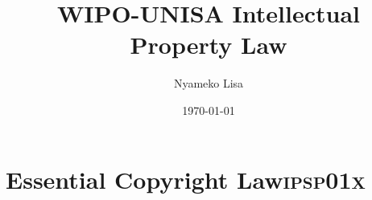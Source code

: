 \documentclass[11pt]{article}
\author{Nyameko Lisa}
\date{\today}
\title{WIPO-UNISA Intellectual Property Law}
\begin{document}
\maketitle
\tableofcontents


\section{Essential Copyright Law\hfill{}\textsc{ipsp01x}}
\label{sec:orge3073a6}
\cite{kogelnik66_laser_beams_reson} 

\cite{corbett95_walite_v_fnb} 

\cite{mccreath91_juta_v_dekoker}
\printbibliography
\end{document}
